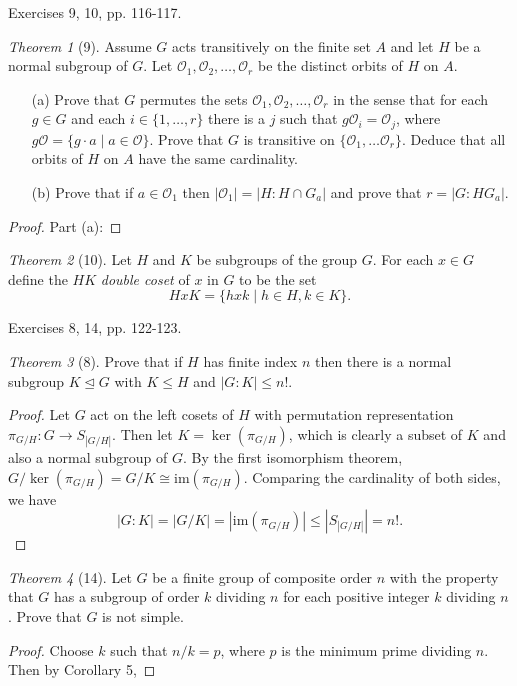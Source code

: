 \documentclass[12pt]{article}
\theoremstyle{remark}
\theoremstyle{named}
\newtheorem*{theorem}{Theorem}
\newcommand{\normal}{\trianglelefteq}
\begin{document}
Exercises 9, 10, pp. 116-117.

\begin{theorem}[9]
    Assume \(G\) acts transitively on the finite set \(A\) and let \(H\) be a normal subgroup of \(G\). Let \(\mathcal O_1, \mathcal O_2, \dots, \mathcal O_r\) be the distinct orbits of \(H\) on \(A\).

    \begin{enumerate}
        \item[(a)] Prove that \(G\) permutes the sets \(\mathcal O_1, \mathcal O_2, \dots, \mathcal O_r\) in the sense that for each \(g \in G\) and each \(i \in \{1, \dots, r\}\) there is a \(j\) such that \(g \mathcal O_i = \mathcal O_j\), where \(g \mathcal O = \{g \cdot a \mid a \in \mathcal O\}\). Prove that \(G\) is transitive on \(\{\mathcal O_1, \dots \mathcal O_r\}\). Deduce that all orbits of \(H\) on \(A\) have the same cardinality.
        
        \item[(b)] Prove that if \(a \in \mathcal O_1\) then \(|\mathcal O_1| = |H : H \cap G_a|\) and prove that \(r = |G : H G_a|\). 
    \end{enumerate}
\end{theorem}

\begin{proof}
    Part (a): 
\end{proof}

\begin{theorem}[10]
    Let \(H\) and \(K\) be subgroups of the group \(G\). For each \(x \in G\) define the \(HK\) \textit{double coset} of \(x\) in \(G\) to be the set
    \[HxK = \{hxk \mid h \in H, k \in K\}.\]
\end{theorem}

Exercises 8, 14, pp. 122-123.

\begin{theorem}[8]
    Prove that if \(H\) has finite index \(n\) then there is a normal subgroup \(K \normal G\) with \(K \le H\) and \(|G : K| \le n!\). 
\end{theorem}

\begin{proof}
    Let \(G\) act on the left cosets of \(H\) with permutation representation \(\pi_{G / H} : G \to S_{|G/H|}\). Then let \(K = \ker (\pi_{G/H})\), which is clearly a subset of \(K\) and also a normal subgroup of \(G\). By the first isomorphism theorem, \(G / \ker(\pi_{G/H}) = G / K \cong \text{im}(\pi_{G/H})\). Comparing the cardinality of both sides, we have \
    \[|G : K| = |G / K| = |\text{im}(\pi_{G / H})| \le |S_{|G / H|}| = n!.\]
\end{proof}

\begin{theorem}[14]
    Let \(G\) be a finite group of composite order \(n\) with the property that \(G\) has a subgroup of order \(k\) dividing \(n\) for each positive integer \(k\) dividing \(n\). Prove that \(G\) is not simple.
\end{theorem}

\begin{proof}
    Choose \(k\) such that \(n / k = p\), where \(p\) is the minimum prime dividing \(n\). Then by Corollary 5, 
\end{proof}
\end{document}
